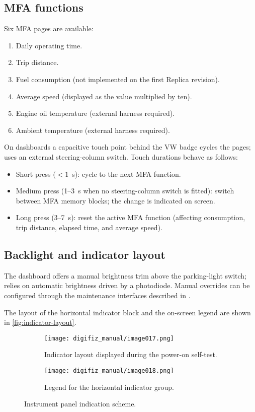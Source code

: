 \subsection{MFA functions}
Six MFA pages are available:
\begin{enumerate}
    \item Daily operating time.
    \item Trip distance.
    \item Fuel consumption (not implemented on the first Replica revision).
    \item Average speed (displayed as the value multiplied by ten).
    \item Engine oil temperature (external harness required).
    \item Ambient temperature (external harness required).
\end{enumerate}
On \ReplicaGenOneShort{} dashboards a capacitive touch point behind the VW badge cycles the pages; \ReplicaNextShort{} uses an external steering-column switch. Touch durations behave as follows:
\begin{itemize}
    \item Short press (\(<1\)~s): cycle to the next MFA function.
    \item Medium press (1--3~s when no steering-column switch is fitted): switch between MFA memory blocks; the change is indicated on screen.
    \item Long press (3--7~s): reset the active MFA function (affecting consumption, trip distance, elapsed time, and average speed).
\end{itemize}

\subsection{Backlight and indicator layout}
The \ReplicaGenOneShort{} dashboard offers a manual brightness trim above the parking-light switch; \ReplicaNextShort{} relies on automatic brightness driven by a photodiode. Manual overrides can be configured through the maintenance interfaces described in .

The layout of the horizontal indicator block and the on-screen legend are shown in \autoref{fig:indicator-layout}.

\begin{figure}[htbp]
    \centering
    \begin{subfigure}{0.48\textwidth}
        \texttt{[image: digifiz\_manual/image017.png]}
        \caption{Indicator layout displayed during the power-on self-test.}
    \end{subfigure}\hfill
    \begin{subfigure}{0.48\textwidth}
        \texttt{[image: digifiz\_manual/image018.png]}
        \caption{Legend for the horizontal indicator group.}
    \end{subfigure}
    \caption{Instrument panel indication scheme.}
    \label{fig:indicator-layout}
\end{figure}

